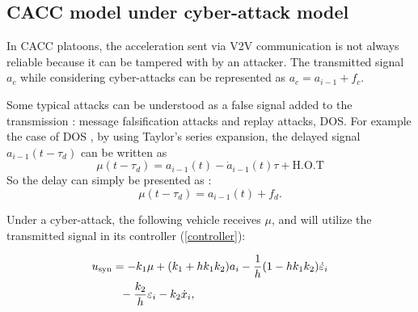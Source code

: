 \documentclass[letterpaper, 10 pt, conference]{ieeeconf}  %
\def\eqref#1{(\ref{#1})}
\newtheorem{remark}{\it Remark}%
\begin{document}
\subsection{CACC model under cyber-attack model}
In CACC platoons, the acceleration sent via V2V communication is not always reliable because it can be tampered with by an attacker. The transmitted signal $a_{c}$ while considering cyber-attacks can be represented as
$a_{c}={a}_{i-1}+f_{c}$.

    Some typical attacks can be understood as a false signal added to the transmission :  
message falsification attacks and replay attacks, DOS. For example the case of DOS , by using Taylor's series expansion, the delayed signal $a_{i-1}(t-\tau_d )$ can be written as
\begin{equation}\mu(t-\tau_d ) = a_{i-1}(t) -\dot{a}_{i-1}(t)\tau+ \text{H.O.T}\end{equation}
So the delay can simply be presented as :
\begin{equation}\mu(t-\tau_d ) = a_{i-1}(t) + f_d. \end{equation}

Under a cyber-attack, the following vehicle receives $\mu$, and 
will utilize the transmitted signal in its controller \eqref{controller}: 

\begin{align}\label{control_uc}
        u_{\text{syn}}&=-k_{1}\mu+(k_{1}+h k_{1}k_{2}){a}_{i}-\frac{1}{h}(1-h k_{1}k_{2})\dot{\varepsilon}_{i}\notag\\
        &~~-\frac{k_{2}}{h}\varepsilon_{i}-k_{2}\dot{x}_{i},
\end{align}
\end{document}
